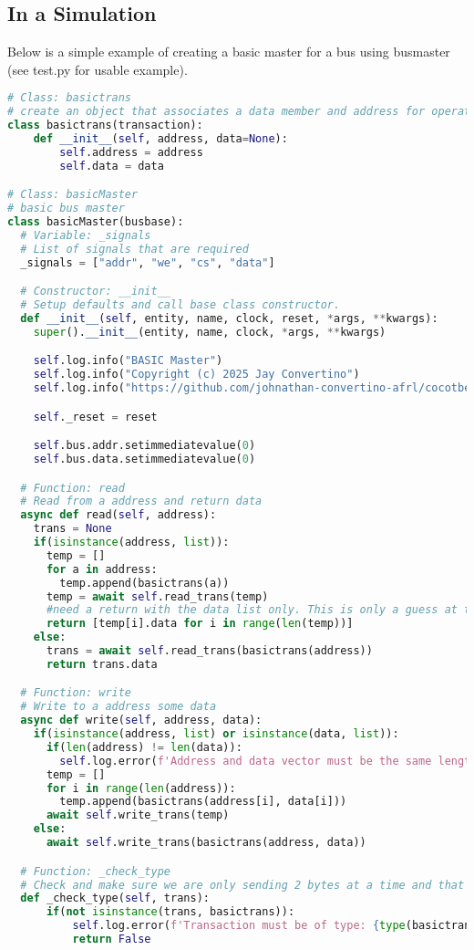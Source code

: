 \subsection{In a Simulation}
\par
Below is a simple example of creating a basic master for a bus using busmaster (see test.py for usable example).
\begin{lstlisting}[language=Python]
# Class: basictrans
# create an object that associates a data member and address for operation.
class basictrans(transaction):
    def __init__(self, address, data=None):
        self.address = address
        self.data = data

# Class: basicMaster
# basic bus master
class basicMaster(busbase):
  # Variable: _signals
  # List of signals that are required
  _signals = ["addr", "we", "cs", "data"]

  # Constructor: __init__
  # Setup defaults and call base class constructor.
  def __init__(self, entity, name, clock, reset, *args, **kwargs):
    super().__init__(entity, name, clock, *args, **kwargs)

    self.log.info("BASIC Master")
    self.log.info("Copyright (c) 2025 Jay Convertino")
    self.log.info("https://github.com/johnathan-convertino-afrl/cocotbext-busbase")

    self._reset = reset

    self.bus.addr.setimmediatevalue(0)
    self.bus.data.setimmediatevalue(0)

  # Function: read
  # Read from a address and return data
  async def read(self, address):
    trans = None
    if(isinstance(address, list)):
      temp = []
      for a in address:
        temp.append(basictrans(a))
      temp = await self.read_trans(temp)
      #need a return with the data list only. This is only a guess at this point
      return [temp[i].data for i in range(len(temp))]
    else:
      trans = await self.read_trans(basictrans(address))
      return trans.data

  # Function: write
  # Write to a address some data
  async def write(self, address, data):
    if(isinstance(address, list) or isinstance(data, list)):
      if(len(address) != len(data)):
        self.log.error(f'Address and data vector must be the same length')
      temp = []
      for i in range(len(address)):
        temp.append(basictrans(address[i], data[i]))
      await self.write_trans(temp)
    else:
      await self.write_trans(basictrans(address, data))

  # Function: _check_type
  # Check and make sure we are only sending 2 bytes at a time and that it is a bytes/bytearray
  def _check_type(self, trans):
      if(not isinstance(trans, basictrans)):
          self.log.error(f'Transaction must be of type: {type(basictrans)}')
          return False


\end{lstlisting}
